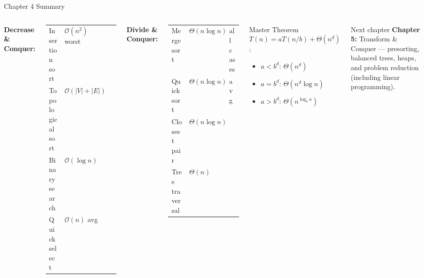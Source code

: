 \documentclass[aspectratio=169]{beamer}
\begin{document}
\begin{frame}[shrink=12]{Chapter 4 Summary}
  \begin{columns}[T]
      \textbf{Decrease \& Conquer:}
      \begin{tabular}{lll}
        Insertion sort & $\mathcal{O}(n^2)$ worst \\
        Topological sort & $\mathcal{O}(|V|+|E|)$ \\
        Binary search & $\mathcal{O}(\log n)$ \\
        Quickselect & $\mathcal{O}(n)$ avg \\
      \end{tabular}
      \vspace{0.3em}

      \textbf{Divide \& Conquer:}
      \begin{tabular}{lll}
        Mergesort & $\Theta(n\log n)$ & all cases \\
        Quicksort & $\Theta(n\log n)$ & avg \\
        Closest pair & $\Theta(n\log n)$ & \\
        Tree traversal & $\Theta(n)$ & \\
      \end{tabular}
      \begin{block}{Master Theorem}
        $T(n)=aT(n/b)+\Theta(n^d)$:
        \begin{itemize}
          \item $a < b^d$: $\Theta(n^d)$
          \item $a = b^d$: $\Theta(n^d\!\log n)$
          \item $a > b^d$: $\Theta(n^{\log_b a})$
        \end{itemize}
      \end{block}
      \vspace{0.2em}
      \begin{block}{Next chapter}
        \textbf{Chapter 5:} Transform \& Conquer —
        presorting, balanced trees, heaps, and
        problem reduction (including linear programming).
      \end{block}
  \end{columns}
\end{frame}
\end{document}
